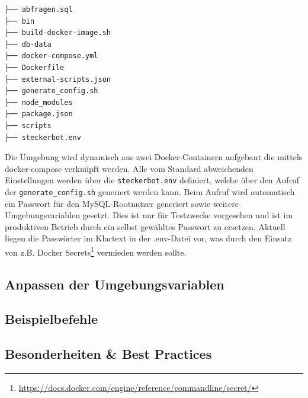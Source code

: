 \begin{verbatim}
├── abfragen.sql
├── bin
├── build-docker-image.sh
├── db-data
├── docker-compose.yml
├── Dockerfile
├── external-scripts.json
├── generate_config.sh
├── node_modules
├── package.json
├── scripts
├── steckerbot.env
\end{verbatim}

Die Umgebung wird dynamisch aus zwei Docker-Containern aufgebaut die mittels docker-compose verknüpft werden. Alle vom Standard abweichenden Einstellungen werden über die \verb+steckerbot.env+ definiert, welche über den Aufruf der \verb+generate_config.sh+ generiert werden kann. Beim Aufruf wird automatisch ein Passwort für den MySQL-Rootnutzer generiert sowie weitere Umgebungsvariablen gesetzt. Dies ist nur für Testzwecke vorgesehen und ist im produktiven Betrieb durch ein selbst gewähltes Passwort zu ersetzen. Aktuell liegen die Passwörter im Klartext in der .env-Datei vor, was durch den Einsatz von z.B. Docker Secrets\footnote{\url{https://docs.docker.com/engine/reference/commandline/secret/}} vermieden werden sollte.

\subsection{Anpassen der Umgebungsvariablen}

\subsection{Beispielbefehle}

\subsection{Besonderheiten \& Best Practices}
